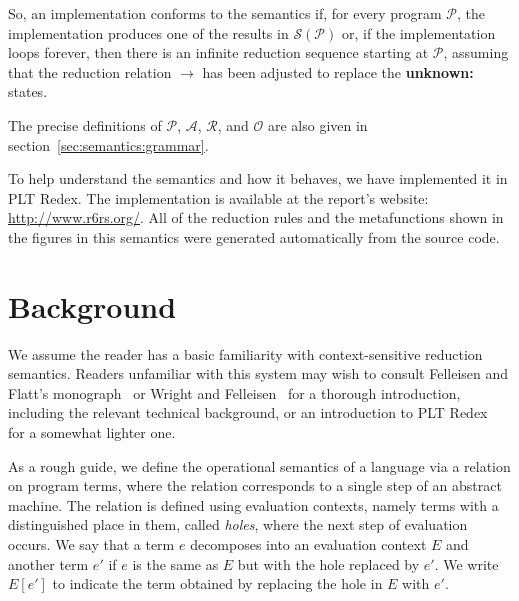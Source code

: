 So, an implementation conforms to the semantics if, for every program $\mathcal{P}$, the implementation produces one of the results in $\mathcal{S}(\mathcal{P})$ or, if the implementation loops forever, then there is an infinite reduction sequence starting at $\mathcal{P}$, assuming that the reduction relation $\rightarrow$ has been adjusted to replace the \textbf{unknown:} states.

The precise definitions of $\mathcal{P}$, $\mathcal{A}$, $\mathcal{R}$, and $\mathscr{O}$ are also given in section~\ref{sec:semantics:grammar}.

To help understand the semantics and how it behaves, we have
implemented it in PLT Redex. The implementation is available at the
report's website: \url{http://www.r6rs.org/}. All of the reduction
rules and the metafunctions shown in the figures in this semantics
were generated automatically from the source code.

\section{Background}

We assume the reader has a basic familiarity with context-sensitive
reduction semantics. Readers unfamiliar with this system may wish to
consult Felleisen and Flatt's monograph~\cite{ff:monograph} or Wright
and Felleisen~\cite{wf:type-soundness} for a thorough introduction,
including the relevant technical background, or an introduction to PLT
Redex~\cite{mfff:plt-redex} for a somewhat lighter one.

As a rough guide, we define the operational semantics of a language
via a relation on program terms, where the relation corresponds to a
single step of an abstract machine. The relation is defined using
evaluation contexts, namely terms with a distinguished place in them,
called \emph{holes}, where the next step of evaluation
occurs. We say that a term $e$ decomposes into an evaluation
context $E$ and another term $e'$ if $e$ is the
same as $E$ but with the hole replaced by $e'$. We write
$E[e']$ to indicate the term obtained by replacing the hole in
$E$ with $e'$.

